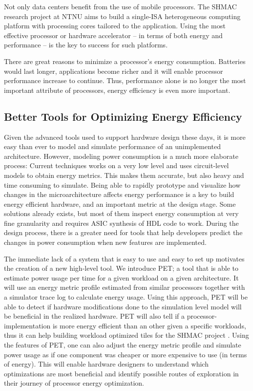 Not only data centers benefit from the use of mobile processors. The SHMAC
research project at NTNU aims to build a single-ISA heterogeneous computing
platform with processing cores tailored to the application. Using the most
effective processor or hardware accelerator -- in terms of both energy
and performance -- is the key to success for such platforms.

There are great reasons to minimize a processor's energy consumption. Batteries
would last longer, applications become richer and it will enable processor
performance increase to continue. Thus, performance alone is no longer the most
important attribute of processors, energy efficiency is even more important.


\subsection{Better Tools for Optimizing Energy Efficiency}

Given the advanced tools used to support hardware design these days, it is more
easy than ever to model and simulate performance of an unimplemented
architecture. However, modeling power consumption is a much more elaborate
process: Current techniques works on a very low level and uses circuit-level
models to obtain energy metrics. This makes them accurate, but also heavy and
time consuming to simulate. Being able to rapidly prototype and visualize how
changes in the microarchitecture affects energy performance is a key to build
energy efficient hardware, and an important metric at the design stage. Some
solutions already exists, but most of them inspect energy consumption at very
fine granularity and requires ASIC synthesis of HDL code to work. During the
design process, there is a greater need for tools that help developers predict
the changes in power consumption when new features are implemented.

The immediate lack of a system that is easy to use and easy to set up motivates
the creation of a new high-level tool. We introduce PET; a tool that is able to
estimate power usage per time for a given workload on a given architecture. It
will use an energy metric profile estimated from similar processors together
with a simulator trace log to calculate energy usage. Using this approach, PET
will be able to detect if hardware modifications done to the simulation level
model will be beneficial in the realized hardware. PET will also tell if a
processor-implementation is more energy efficient than an other given a specific
workloads, thus it can help building workload optimized tiles for the SHMAC
project \cite{shmacwebpage}. Using the features of PET, one can also adjust the
energy metric profile and simulate power usage as if one component was cheaper
or more expensive to use (in terms of energy). This will enable hardware designers to
understand which optimizations are most beneficial and identify possible routes
of exploration in their journey of processor energy optimization.

